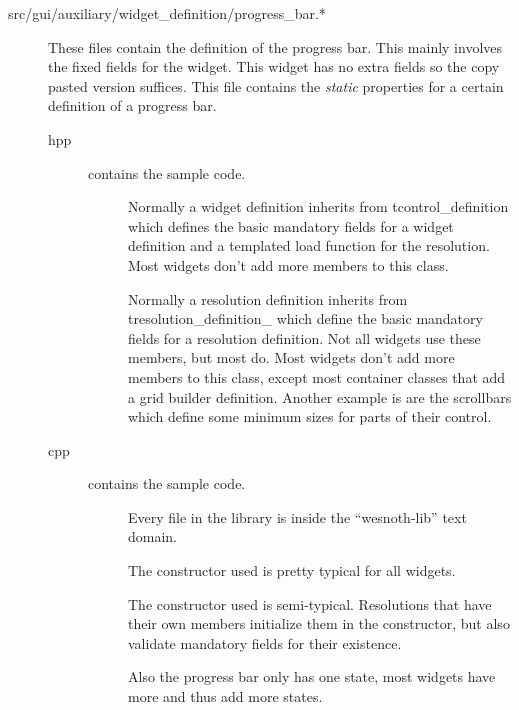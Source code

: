 \begin{description}

\item[src/gui/auxiliary/widget\_definition/progress\_bar.*]
	These files contain the definition of the progress bar. This mainly involves
	the fixed fields for the widget. This widget has no extra fields so the copy
	pasted version suffices. This file contains the \emph{static} properties for
	a certain definition of a progress bar.

\begin{description}
\item[hpp]  contains the sample code. 
	\begin{description}
	\item[] Normally a
		widget definition inherits from tcontrol\_definition which defines the
		basic mandatory fields for a widget definition and a templated load
		function for the resolution. Most widgets don't add more members to this
		class.
	\item[] Normally a resolution
		definition inherits from tresolution\_definition\_ which define the
		basic mandatory fields for a resolution definition. Not all widgets use
		these members, but most do. Most widgets don't add more members to this
		class, except most container classes that add a grid builder
		definition. Another example is are the scrollbars which define some
		minimum sizes for parts of their control.
	\end{description}

\item[cpp]  contains the sample code. 
	\begin{description}
	\item[] Every file in the library
		is inside the ``wesnoth-lib'' text domain.
	\item[] The constructor used is
		pretty typical for all widgets.
	\item[] The
		constructor used is semi-typical. Resolutions that have their own
		members initialize them in the constructor, but also validate mandatory
		fields for their existence.

		Also the progress bar only has one state, most widgets have more and
		thus add more states.


\end{description}
\end{description}
\end{description}
